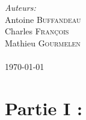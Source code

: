 \documentclass[12pt]{article}
\begin{document}
\begin{titlepage}
\Large \emph{Auteurs:}\\
Antoine \textsc{Buffandeau}\\
Charles \textsc{François}\\
Mathieu \textsc{Gourmelen}\\
 \textsc{}
\\[1cm]
{\large \today} %
\vfill
\end{titlepage}
\tableofcontents
\clearpage
\hypertarget{sec:part1}{}
\section{Partie I : }

%
%
\end{document}
